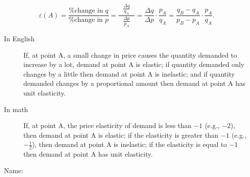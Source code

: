 \documentclass{article}
\begin{document}
\begin{EXAM}
\begin{itemize}
\[
\varepsilon (A)=\frac{\mbox{\% change in } q}{\mbox{\% change in } p} = \displaystyle\frac{\ \ \ \displaystyle\frac{\Delta q}{q_A}\ \ \ }{\displaystyle\frac{\Delta p}{p_A}} =
\frac{\Delta q}{\Delta p}\cdot\frac{p_A}{q_A} =
\frac{q_B-q_A}{p_B-p_A}\cdot\frac{p_A}{q_A}.
\]

\enlargethispage{2\baselineskip}

\begin{description}

\item [In English] If, at point A, a small change in price causes
the quantity demanded to increase by a lot, demand at point A is
elastic; if quantity demanded only changes by a little then demand
at point A is inelastic; and if quantity demanded changes by a
proportional amount then demand at point A has unit elasticity.

\item [In math] If, at point A, the price elasticity of demand is
less than $-1$ (e.g., $-2$), then demand at point A is elastic; if
the elasticity is greater than $-1$ (e.g., $-\frac{1}{2}$), then
demand at point A is inelastic; if the elasticity is equal to $-1$
then demand at point A has unit elasticity.

\end{description}


\end{itemize}

\clearpage


\vspace*{-3cm}

\begin{flushright}
Name: \hspace*{1in}
\end{flushright}

\bigskip


\end{EXAM}
\end{document}
